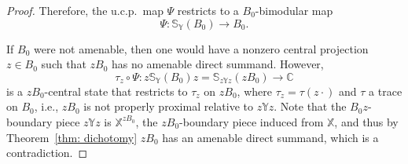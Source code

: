 \documentclass[a4paper,11pt]{amsart}
\theoremstyle{definition}
\newcommand{\B}{{\mathbb B}}
\newcommand{\C}{{\mathbb C}}
\newcommand{\K}{{\mathbb K}}
\newcommand{\R}{{\mathbb R}}
\newcommand{\bS}{{\mathbb S}}
\newcommand{\X}{{\mathbb X}}
\newcommand{\Y}{{\mathbb Y}}
\newcommand{\cF}{{\mathcal F}}
\newcommand{\sH}{\mathsf{H}}
\newcommand{\id}{\operatorname{id}}
\newcommand{\Tr}{\operatorname{Tr}}
\newcommand{\ot}{\otimes}
\begin{document}
\begin{proof}
Therefore, the u.c.p.\ map $\Psi$ restricts to a $B_0$-bimodular map
$$
\Psi: \bS_\Y(B_0)\to B_0.
$$

If $B_0$ were not amenable, then one would have a nonzero central projection $z\in B_0$ such that $zB_0$ has no amenable direct summand.
However, 
$$\tau_z\circ \Psi: z\bS_\Y(B_0)z=\bS_{z\Y z}(zB_0)\to \C$$ 
	is a $zB_0$-central state that restricts to $\tau_z$ on $zB_0$,
	where $\tau_z=\tau(z\cdot)$ and $\tau$ a trace on $B_0$,
	i.e., $zB_0$ is not properly proximal relative to $z\Y z$.
Note that the $B_0z$-boundary piece $z\Y z$ is $\X^{zB_0}$, the $zB_0$-boundary piece induced from $\X$,
	and thus by Theorem~\ref{thm: dichotomy} $zB_0$ has an amenable direct summand, which is a contradiction.
%
%	
%
%
%
\end{proof}
\end{document}
